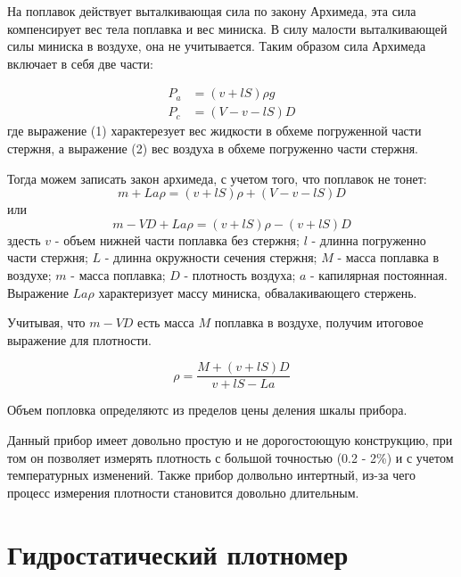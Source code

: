 \documentclass[russian, utf8]{eskdtext}
\begin{document}
\newpage

На поплавок действует выталкивающая сила по закону Архимеда, эта сила компенсирует вес тела поплавка и вес миниска. В силу малости выталкивающей силы миниска в воздухе, она не учитывается. Таким образом сила Архимеда включает в себя две части:

\begin{align}
	P_a & = (v + lS)\rho g \\
	P_c & = (V - v - lS)D
\end{align}
где выражение (1) характерезует вес жидкости в обхеме погруженной части стержня, а выражение (2) вес воздуха в обхеме погруженно части стержня. \par

Тогда можем записать закон архимеда, с учетом того, что поплавок не тонет: 
\begin{equation}
	m + La\rho = (v + lS)\rho + (V - v - lS)D
\end{equation}
или
\begin{equation}
	m - VD + La\rho = (v + lS)\rho - (v + lS)D
\end{equation}
здесть $v$ - объем нижней части поплавка без стержня; $l$ - длинна погруженно части стержня; $L$ - длинна окружности сечения стержня; $M$ - масса поплавка в воздухе; $m$ - масса поплавка; $D$ - плотность воздуха; $a$ - капилярная постоянная. Выражение $La\rho$ характеризует массу миниска, обвалакивающего стержень. \par 

Учитывая, что $m - VD$ есть масса $M$ поплавка в воздухе, получим итоговое выражение для плотности.

\begin{equation}
	\rho = \frac{M + (v + lS)D}{v + lS - La}
\end{equation}

Объем попловка определяютс из пределов цены деления шкалы прибора. \par

Данный прибор имеет довольно простую и не дорогостоющую конструкцию, при том он позволяет измерять плотность с большой точностью (0.2 - 2\%) и с учетом температурных изменений. Также прибор долвольно интертный, из-за чего процесс измерения плотности становится довольно длительным. 

\newpage

\section{Гидростатический плотномер}
\end{document}
